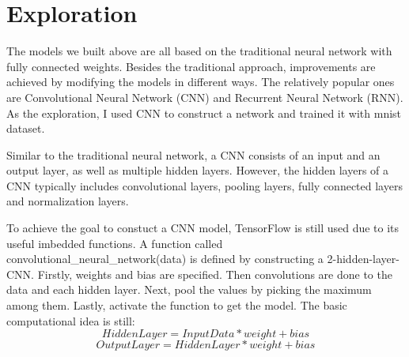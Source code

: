 \documentclass[11pt]{article}
\begin{document}
    \hypertarget{exploration}{%
\section{Exploration}\label{exploration}}

    The models we built above are all based on the traditional neural
network with fully connected weights. Besides the traditional approach,
improvements are achieved by modifying the models in different ways. The
relatively popular ones are Convolutional Neural Network (CNN) and
Recurrent Neural Network (RNN). As the exploration, I used CNN to
construct a network and trained it with mnist dataset.

Similar to the traditional neural network, a CNN consists of an input
and an output layer, as well as multiple hidden layers. However, the
hidden layers of a CNN typically includes convolutional layers, pooling
layers, fully connected layers and normalization layers.

To achieve the goal to constuct a CNN model, TensorFlow is still used
due to its useful imbedded functions. A function called
convolutional\_neural\_network(data) is defined by constructing a
2-hidden-layer-CNN. Firstly, weights and bias are specified. Then
convolutions are done to the data and each hidden layer. Next, pool the
values by picking the maximum among them. Lastly, activate the function
to get the model. The basic computational idea is still:
\[ Hidden Layer = Input Data * weight + bias \]
\[ Output Layer = Hidden Layer * weight + bias \]
\end{document}
